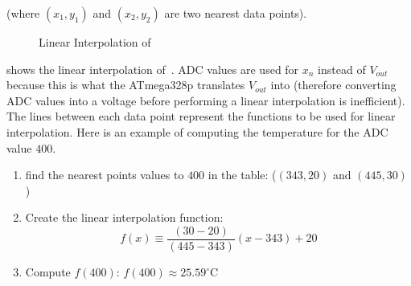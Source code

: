 \documentclass[main.tex]{subfiles}
\begin{document}
	(where $\left(x_{1},y_{1} \right)$ and $\left(x_{2},y_{2}\right)$ are two
	nearest data points). 

	
	\begin{figure}[H]
		\begin{center}
			
		\end{center}
		\caption{Linear Interpolation of~}
		\label{fig:adcTempGraph}
	\end{figure}
	
	 shows the linear interpolation of~.
	ADC values are used for $x_{n}$ instead of $V_{out}$ because this is what the
	ATmega328p translates $V_{out}$ into (therefore converting ADC values into a
	voltage before performing a linear interpolation is inefficient). The lines
	between each data point represent the functions to be used for linear
	interpolation\footnotemark. Here is an example of computing the temperature
	for the ADC value $400$.

	\begin{enumerate}
		\item find the nearest points values to $400$ in the table: ($(343,20)$ and
			$(445,30)$)  
		\item Create the linear interpolation function:
			\[
				f(x) \equiv \frac{(30-20)}{(445-343)}(x-343)+20
			\]
		\item Compute $f\left(400 \right)$: $f(400) \approx 25.59^{\circ}\mathrm{C}$
	\end{enumerate}


	
	
\end{document}
